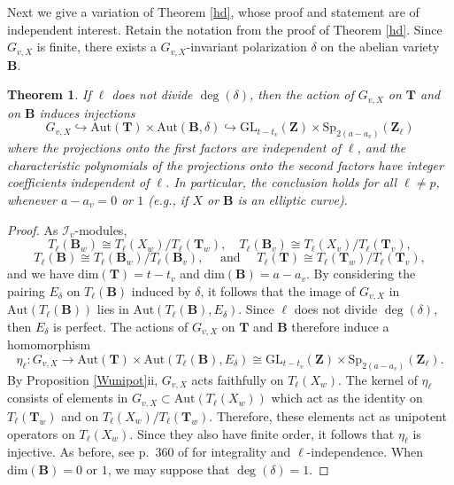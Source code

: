\documentclass{amsart}
\def\Z{{\mathbf Z}}
\def\Aut{\mathrm{Aut}}
\def\I{{\mathcal I}}
\def\GL{\mathrm{GL}}
\def\Sp{\mathrm{Sp}}
\def\dim{\mathrm{dim}}
\def\T{{\mathbf T}}
\def\B{{\mathbf B}}
\newtheorem{thm}{Theorem}[section]
\theoremstyle{definition}
\begin{document}
Next we give a variation of Theorem \ref{hd}, whose proof
and statement are of independent interest. 
Retain the notation from the proof of Theorem \ref{hd}.
Since $G_{v,X}$ is finite, there exists a 
$G_{v,X}$-invariant polarization $\delta$ on the abelian variety $\B$. 

\begin{thm}
\label{hd3}
If $\ell$ does not divide $\deg(\delta)$, then 
the action of $G_{v,X}$ on $\T$ and on $\B$ induces
injections
$$G_{v,X} 
\hookrightarrow \Aut(\T) \times \Aut(\B,\delta)
\hookrightarrow 
\GL_{t-t_{v}}(\Z) \times \Sp_{2(a-a_{v})}(\Z_{\ell})$$
where the projections
onto the first factors are independent of $\ell$,
and the characteristic polynomials of the projections onto the
second factors have integer coefficients independent of $\ell$.
In particular, the conclusion holds for all $\ell \ne p$,
whenever $a-a_v=0$ or $1$ 
(e.g., if $X$ or $\B$ is an elliptic curve).
\end{thm}

\begin{proof}
As $\I_{v}$-modules,  
$$T_{\ell}(\B_{w}) \cong T_{\ell}(X_{w})/T_{\ell}(\T_{w}), \quad
T_{\ell}(\B_{v}) \cong T_{\ell}(X_{v})/T_{\ell}(\T_{v}),$$
$$T_{\ell}(\B) \cong T_{\ell}(\B_{w})/T_{\ell}(\B_{v}), \quad 
\text{ and } \quad 
T_{\ell}(\T) \cong T_{\ell}(\T_{w})/T_{\ell}(\T_{v}),$$ 
and we have  
$\dim(\T) = t - t_{v}$ and $\dim(\B) = a - a_{v}$. 
By considering the pairing $E_\delta$ 
on $T_{\ell}(\B)$ induced by $\delta$, 
it follows that the image of $G_{v,X}$ in 
$\Aut(T_{\ell}(\B))$ lies in $\Aut(T_{\ell}(\B),E_\delta)$.
Since $\ell$ does not divide $\deg(\delta)$,
then $E_\delta$ is perfect.
The actions of $G_{v,X}$ on $\T$ and $\B$ therefore induce
a homomorphism 
$$\eta_{\ell} : G_{v,X} \to 
\Aut(\T) \times \Aut(T_\ell(\B),E_\delta) \cong 
\GL_{t-t_{v}}(\Z) \times 
\Sp_{2(a-a_{v})}(\Z_{\ell}).$$
By Proposition \ref{Wunipot}ii, $G_{v,X}$ acts faithfully on 
$T_{\ell}(X_{w})$.
The kernel of $\eta_{\ell}$ consists of elements 
   in     $G_{v,X} \subset \Aut(T_{\ell}(X_w))$
 which act as the identity on 
$T_{\ell}({\T}_w)$ and on $T_{\ell}(X_w)/T_{\ell}({\T}_w)$.
Therefore, these elements act as  unipotent operators on 
$T_{\ell}(X_w)$. Since they also have finite order, 
it follows that $\eta_{\ell}$ is injective.  
As before, see p.~360 of \cite{SGA} for  
integrality and $\ell$-independence.
When $\dim(\B)=0$ or $1$, we may suppose 
that $\deg(\delta)=1$.
\end{proof}
\end{document}
